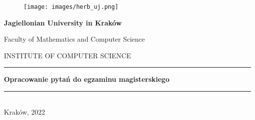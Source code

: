 \begin{titlepage}

    \begin{figure}
        \centering
        \texttt{[image: images/herb\_uj.png]}
        \label{fig:herb_uj}
    \end{figure}

    \begin{center}

        \renewcommand{\baselinestretch}{1}
        \large{\textbf{Jagiellonian University in Kraków}}
        \smallskip

        \normalsize{Faculty of Mathematics and Computer Science}
        \smallskip

        \small{INSTITUTE OF COMPUTER SCIENCE}
        \renewcommand{\baselinestretch}{1.5}

        \vspace{1cm}

        \vspace{1cm}
        \hrule
        \vspace{1cm}

        \renewcommand{\baselinestretch}{1}
        \LARGE{\textbf{Opracowanie pytań do egzaminu magisterskiego}}
        \renewcommand{\baselinestretch}{1.5}

        \vspace{1cm}
        \hrule
        \vspace{1cm}

    \end{center}
    
    \bigskip
    \bigskip

    \renewcommand{\arraystretch}{0.85}
    \begin{tabularx}{0.7\textwidth}{
        >{\raggedright\arraybackslash}X
        >{\raggedright\arraybackslash}X }
%
    \end{tabularx}

    \vfill

    \begin{center}
        \normalsize{Kraków, 2022}
    \end{center}

\end{titlepage}
